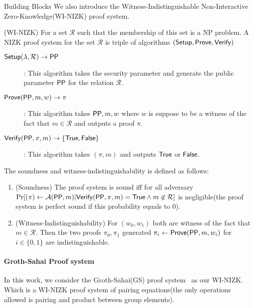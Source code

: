 \begin{subsection}{Building Blocks}
    We also introduce the Witness-Indistinguishable Non-Interactive Zero-Knowledge(WI-NIZK) proof system.
    \begin{myDef}{(WI-NIZK)} For a set $\mathcal{R}$ such that the membership of this set is a NP problem. A NIZK proof system for the set $\mathcal{R}$ is triple of algorithms $({\mathsf{Setup}}, {\mathsf{Prove}}, {\mathsf{Verify}})$
      \begin{description}
      \item[$\boldmath{{\mathsf{Setup}}(\lambda, \mathcal{R}) \to \mathsf{PP}}$]: This algorithm takes the security parameter and generate the public parameter $\mathsf{PP}$ for the relation $\mathcal{R}$. 
      \item[$\boldmath{{\mathsf{Prove}}(\mathsf{PP}, m, w) \to \pi}$]: This algorithm takes $\mathsf{PP}, m, w$ where $w$ is suppose to be a witness of the fact that $m \in \mathcal{R}$ and outputs a proof $\pi$. 
      \item[$\boldmath{{\mathsf{Verify}}(\mathsf{PP}, \pi, m) \to \{\mathsf{True}, \mathsf{False}\}}$]: This algorithm takes $(\pi, m)$ and outputs $\mathsf{True}$ or $\mathsf{False}$.
      \end{description}

      The soundness and witness-indistinguishability is defined as follows:
      \begin{enumerate}
      \item (Soundness) The proof system is sound iff for all adversary $\operatorname{Pr}[(\pi) \gets \mathcal{A}(\mathsf{PP}, m)| {\mathsf{Verify}}(\mathsf{PP}, \pi, m) = \mathsf{True} \wedge m \not \in \mathcal{R}]$ is negligible(the proof system is perfect sound if this probability equals to $0$).
      \item (Witness-Indistinguishability) For $(w_0, w_1)$ both are witness of the fact that $m \in \mathcal{R}$. Then the two proofs $\pi_0, \pi_1$ generated $\pi_i \gets {\mathsf{Prove}}(\mathsf{PP}, m, w_i)$ for $i \in \{0,1\}$ are indistinguishable.
      \end{enumerate}
      
     
      
    \end{myDef}


    \paragraph{Groth-Sahai Proof system}
    In this work, we consider the Groth-Sahai(GS) proof system~\cite{DBLP:journals/eccc/GrothS07} as our WI-NIZK. Which is a WI-NIZK proof system of pairing equations(the only operations allowed is pairing and product between group elements).


\end{subsection}
